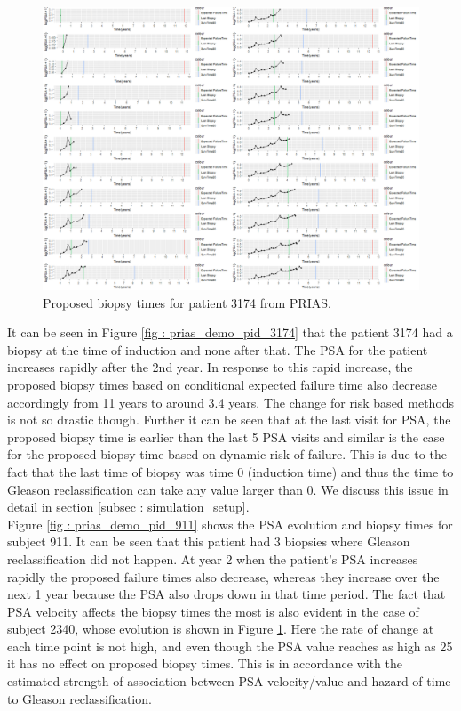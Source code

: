 \begin{figure}[!htb]
\centering
\captionsetup{justification=centering}
\includegraphics[width=\textwidth]{prias_demo_pid_2340.png}
\caption{\label{fig : prias_demo_pid_2340} Proposed biopsy times for patient 3174 from PRIAS.}
\end{figure}

It can be seen in Figure \ref{fig : prias_demo_pid_3174} that the patient 3174 had a biopsy at the time of induction and none after that. The PSA for the patient increases rapidly after the 2nd year. In response to this rapid increase, the proposed biopsy times based on conditional expected failure time also decrease accordingly from 11 years to around 3.4 years. The change for risk based methods is not so drastic though. Further it can be seen that at the last visit for PSA, the proposed biopsy time is earlier than the last 5 PSA visits and similar is the case for the proposed biopsy time based on dynamic risk of failure. This is due to the fact that the last time of biopsy was time 0 (induction time) and thus the time to Gleason reclassification can take any value larger than 0. We discuss this issue in detail in section \ref{subsec : simulation_setup}.\\

Figure \ref{fig : prias_demo_pid_911} shows the PSA evolution and biopsy times for subject 911. It can be seen that this patient had 3 biopsies where Gleason reclassification did not happen. At year 2 when the patient's PSA increases rapidly the proposed failure times also decrease, whereas they increase over the next 1 year because the PSA also drops down in that time period. The fact that PSA velocity affects the biopsy times the most is also evident in the case of subject 2340, whose evolution is shown in Figure \ref{fig : prias_demo_pid_2340}. Here the rate of change at each time point is not high, and even though the PSA value reaches as high as 25 it has no effect on proposed biopsy times. This is in accordance with the estimated strength of association between PSA velocity/value and hazard of time to Gleason reclassification.\\

